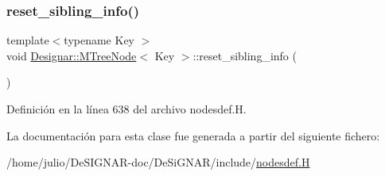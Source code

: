 \subsubsection{\texorpdfstring{reset\+\_\+sibling\+\_\+info()}{reset\_sibling\_info()}}
{\footnotesize\ttfamily template$<$typename Key $>$ \\
void \hyperlink{class_designar_1_1_m_tree_node}{Designar\+::\+M\+Tree\+Node}$<$ Key $>$\+::reset\+\_\+sibling\+\_\+info (\begin{DoxyParamCaption}{ }\end{DoxyParamCaption})\hspace{0.3cm}{\ttfamily [inline]}}



Definición en la línea 638 del archivo nodesdef.\+H.



La documentación para esta clase fue generada a partir del siguiente fichero\+:\begin{DoxyCompactItemize}
\item 
/home/julio/\+De\+S\+I\+G\+N\+A\+R-\/doc/\+De\+Si\+G\+N\+A\+R/include/\hyperlink{nodesdef_8_h}{nodesdef.\+H}\end{DoxyCompactItemize}
